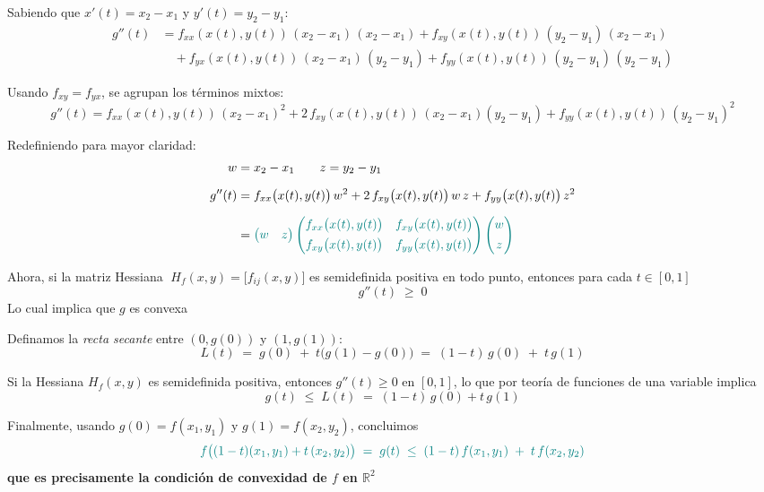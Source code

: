 \documentclass{article}
\begin{document}
Sabiendo que \(x'(t)=x_2-x_1\) y \(y'(t)=y_2-y_1\):
\[
\begin{aligned}
g''(t)
&= f_{xx}(x(t),y(t))\,(x_2 - x_1)\,(x_2 - x_1)
+ f_{xy}(x(t),y(t))\,(y_2 - y_1)\,(x_2 - x_1)\\
&\quad
+ f_{yx}(x(t),y(t))\,(x_2 - x_1)\,(y_2 - y_1)
+ f_{yy}(x(t),y(t))\,(y_2 - y_1)\,(y_2 - y_1)
\end{aligned}
\]

Usando \(f_{xy}=f_{yx}\), se agrupan los términos mixtos:
\[
g''(t)
= f_{xx}(x(t),y(t))\,(x_2 - x_1)^2
+ 2\,f_{xy}(x(t),y(t))\,(x_2 - x_1)(y_2 - y_1)
+ f_{yy}(x(t),y(t))\,(y_2 - y_1)^2
\]

Redefiniendo para mayor claridad:
\[
\begin{aligned}
w &= x_2 - x_1
\qquad
z = y_2 - y_1\\[6pt]
g''(t)
&= f_{xx}\bigl(x(t),y(t)\bigr)\,w^2
 + 2\,f_{xy}\bigl(x(t),y(t)\bigr)\,w\,z
 + f_{yy}\bigl(x(t),y(t)\bigr)\,z^2\\[6pt]
&= \color{teal}
\begin{pmatrix}w & z\end{pmatrix}
\begin{pmatrix}
f_{xx}\bigl(x(t),y(t)\bigr) & f_{xy}\bigl(x(t),y(t)\bigr)\\[4pt]
f_{xy}\bigl(x(t),y(t)\bigr) & f_{yy}\bigl(x(t),y(t)\bigr)
\end{pmatrix}
\begin{pmatrix}w\\[4pt]z\end{pmatrix}
\end{aligned}
\]

\noindent Ahora, si la matriz Hessiana
\(\;H_f(x,y)=\bigl[f_{ij}(x,y)\bigr]\)
es semidefinida positiva en todo punto, entonces para cada \(t\in[0,1]\)
\[
g''(t)\;\ge\;0
\]
Lo cual implica que \(g\) es convexa  

Definamos la \emph{recta secante} entre \((0,g(0))\) y \((1,g(1))\):
\[
L(t) \;=\; g(0)\;+\;t\bigl(g(1)-g(0)\bigr)
\;=\;(1-t)\,g(0) \;+\; t\,g(1)
\]

Si la Hessiana \(H_f(x,y)\) es semidefinida positiva, entonces \(g''(t)\ge0\) en \([0,1]\), lo que por teoría de funciones de una variable implica
\[
g(t)\;\le\;L(t)\;=\;(1-t)\,g(0) + t\,g(1)
\]

Finalmente, usando \(g(0)=f(x_1,y_1)\) y \(g(1)=f(x_2,y_2)\), concluimos
\[
\color{teal}
f\bigl((1-t)(x_1,y_1)+t\,(x_2,y_2)\bigr)
\;=\;g(t)
\;\le\;
(1-t)\,f(x_1,y_1) \;+\; t\,f(x_2,y_2)
\]
\textbf{\color{teal}que es precisamente la condición de convexidad de \(f\) en \(\mathbb{R}^2\)}
\end{document}
